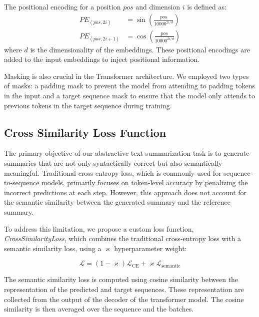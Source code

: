 The positional encoding for a position \(pos\) and dimension \(i\) is defined as:
\begin{equation}
	\begin{aligned}
		PE_{(pos, 2i)} &= \sin\left(\frac{pos}{10000^{2i/d}}\right) \\
		PE_{(pos, 2i+1)} &= \cos\left(\frac{pos}{10000^{2i/d}}\right)
	\end{aligned}
\end{equation}
where \(d\) is the dimensionality of the embeddings. These positional encodings are added to the input embeddings to inject positional information.

Masking is also crucial in the Transformer architecture. We employed two types of masks: a padding mask to prevent the model from attending to padding tokens in the input and a target sequence mask to ensure that the model only attends to previous tokens in the target sequence during training.


\subsection{Cross Similarity Loss Function}
The primary objective of our abstractive text summarization task is to generate summaries that are not only syntactically correct but also semantically meaningful. Traditional cross-entropy loss, which is commonly used for sequence-to-sequence models, primarily focuses on token-level accuracy by penalizing the incorrect predictions at each step. However, this approach does not account for the semantic similarity between the generated summary and the reference summary.

To address this limitation, we propose a custom loss function, \textit{CrossSimilarityLoss}, which combines the traditional cross-entropy loss\cite{CrossEnrtopyLoss} with a semantic similarity loss, using a $\varkappa$ hyperparameter weight:

\begin{equation}
    \mathcal{L} = (1 - \varkappa) \mathcal{L}_{\text{CE}} + \varkappa \mathcal{L}_{\text{semantic}}
\end{equation}

The semantic similarity loss is computed using cosine similarity\cite{cosineSimilarity} between the representation of the predicted and target sequences. These representation are collected from the output of the decoder of the transformer model. The cosine similarity is then averaged over the sequence and the batches.

